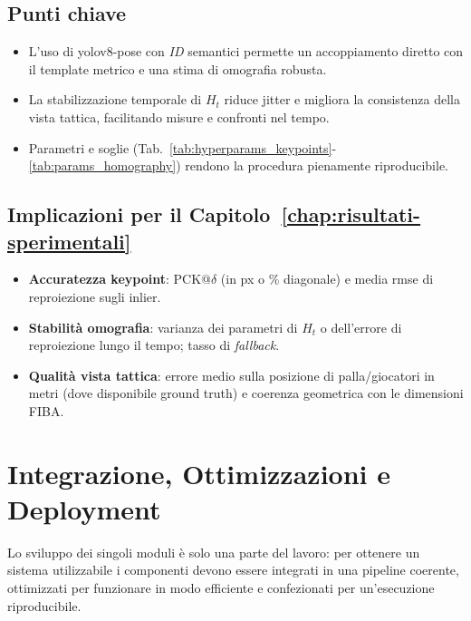 \documentclass[12pt,a4paper,openright,twoside]{book}
\begin{document}
\subsection*{Punti chiave}
\begin{itemize}
  \item L'uso di \ac{yolo}v8-pose con \emph{ID} semantici permette un accoppiamento diretto
  con il template metrico e una stima di omografia robusta.
  \item La stabilizzazione temporale di $H_t$ riduce jitter e migliora la consistenza della
  vista tattica, facilitando misure e confronti nel tempo.
  \item Parametri e soglie (Tab.~\ref{tab:hyperparams_keypoints}-\ref{tab:params_homography})
  rendono la procedura pienamente riproducibile.
\end{itemize}

\subsection*{Implicazioni per il Capitolo~\ref{chap:risultati-sperimentali}}
\begin{itemize}
  \item \textbf{Accuratezza keypoint}: PCK@$\delta$ (in px o \% diagonale) e media \ac{rmse}
  di reproiezione sugli inlier.
  \item \textbf{Stabilità omografia}: varianza dei parametri di $H_t$ o dell'errore di
  reproiezione lungo il tempo; tasso di \emph{fallback}.
  \item \textbf{Qualità vista tattica}: errore medio sulla posizione di palla/giocatori
  in metri (dove disponibile ground truth) e coerenza geometrica con le dimensioni FIBA.
\end{itemize}


\section{Integrazione, Ottimizzazioni e Deployment}
\label{sec:integrazione-ottimizzazioni}

Lo sviluppo dei singoli moduli è solo una parte del lavoro: per ottenere un sistema
utilizzabile i componenti devono essere integrati in una pipeline coerente, ottimizzati
per funzionare in modo efficiente e confezionati per un'esecuzione riproducibile.
\end{document}
